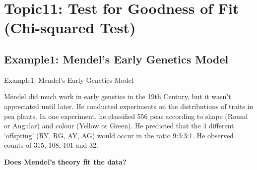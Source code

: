 \documentclass[t,xcolor=pdftex,dvipsnames,table]{beamer}\usepackage[]{graphicx}\usepackage[]{color}
\begin{document}
\section[11]{Topic11: Test for Goodness of Fit (Chi-squared Test)}


\subsection[GoodnessofFit]{Example1: Mendel's Early Genetics Model}
\begin{frame}{Example1: Mendel's Early Genetics Model}

Mendel did much work in early genetics in the 19th Century, but it wasn't appreciated until later. He conducted experiments on the distributions of traits in pea plants. In one experiment, he classified 556 peas according to shape (Round or Angular) and colour (Yellow or Green). He predicted that the 4 different `offspring' (RY, RG, AY, AG) would occur in the ratio 9:3:3:1. He observed counts of 315, 108, 101 and 32. 

\vspace{.5cm}
{\bf Does Mendel's theory fit the data?}

\end{frame}
\end{document}
